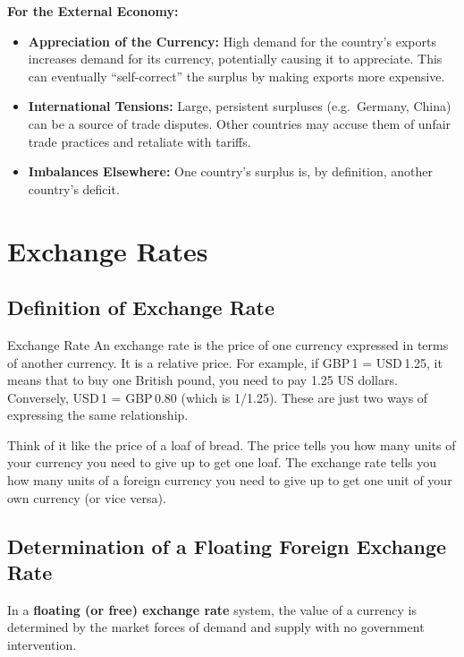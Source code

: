 \documentclass[11pt, a4paper, twoside]{book}
\begin{document}
\textbf{For the External Economy:}
\begin{itemize}
  \item \textbf{Appreciation of the Currency:} High demand for the country's exports increases demand for its currency, potentially causing it to appreciate. This can eventually ``self-correct'' the surplus by making exports more expensive.
  \item \textbf{International Tensions:} Large, persistent surpluses (e.g.\ Germany, China) can be a source of trade disputes. Other countries may accuse them of unfair trade practices and retaliate with tariffs.
  \item \textbf{Imbalances Elsewhere:} One country's surplus is, by definition, another country's deficit.
\end{itemize}

\section{Exchange Rates}

\subsection{Definition of Exchange Rate}

\begin{keyterm}{Exchange Rate}
An exchange rate is the price of one currency expressed in terms of another currency. It is a relative price. For example, if GBP\,1 = USD\,1.25, it means that to buy one British pound, you need to pay 1.25 US dollars. Conversely, USD\,1 = GBP\,0.80 (which is 1/1.25). These are just two ways of expressing the same relationship.
\end{keyterm}

Think of it like the price of a loaf of bread. The price tells you how many units of your currency you need to give up to get one loaf. The exchange rate tells you how many units of a foreign currency you need to give up to get one unit of your own currency (or vice versa).

\subsection{Determination of a Floating Foreign Exchange Rate}

In a \textbf{floating (or free) exchange rate} system, the value of a currency is determined by the market forces of demand and supply with no government intervention.
\end{document}
